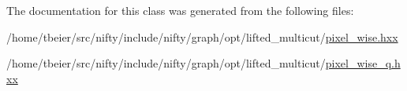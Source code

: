 The documentation for this class was generated from the following files\+:\begin{DoxyCompactItemize}
\item 
/home/tbeier/src/nifty/include/nifty/graph/opt/lifted\+\_\+multicut/\hyperlink{pixel__wise_8hxx}{pixel\+\_\+wise.\+hxx}\item 
/home/tbeier/src/nifty/include/nifty/graph/opt/lifted\+\_\+multicut/\hyperlink{pixel__wise__q_8hxx}{pixel\+\_\+wise\+\_\+q.\+hxx}\end{DoxyCompactItemize}
